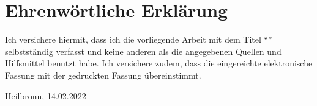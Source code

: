 \clearpage
\chapter*{Ehrenwörtliche Erklärung}


Ich versichere hiermit, dass ich die vorliegende Arbeit mit dem Titel ``\textit{\DerTitelDerArbeit}'' selbstständig verfasst und 
keine anderen als die angegebenen Quellen und Hilfsmittel benutzt habe. Ich versichere zudem, dass die eingereichte elektronische 
Fassung mit der gedruckten Fassung übereinstimmt.

\vspace{3cm}
Heilbronn, 14.02.2022 \hfill \DerAutorDerArbeit
